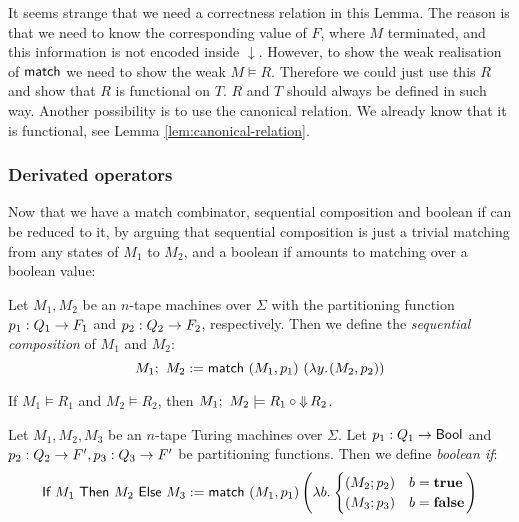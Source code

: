 \documentclass{psartcl}
\begin{document}
It seems strange that we need a correctness relation in this Lemma.  The reason is that we need to know the corresponding value of $F$, where $M$
terminated, and this information is not encoded inside $\downarrow$.  However, to show the weak realisation of $\textsf{match}$ we need to show the weak
$M \vDash R$.  Therefore we could just use this $R$ and show that $R$ is functional on $T$.  $R$ and $T$ should always be defined in such way.
Another possibility is to use the canonical relation.  We already know that it is functional, see Lemma \ref{lem:canonical-relation}.

\subsubsection{Derivated operators}

Now that we have a match combinator, sequential composition and boolean if can be reduced to it, by arguing that sequential composition is just a
trivial matching from any states of $M_1$ to $M_2$, and a boolean if amounts to matching over a boolean value:


\begin{definition}
  \label{def:seq}
  Let $M_1, M_2$ be an $n$-tape machines over $\Sigma$ with the partitioning function $p_1 : Q_1 \rightarrow F_1$ and $p_2 : Q_2 \rightarrow F_2$,
  respectively.  Then we define the \emph{sequential composition} of $M_1$ and $M_2$:
  $$M_1 ;~ M_2 := \textsf{match}~(M_1, p_1)~(\lambda y{.}\hskip.7pt(M_2, p_2))$$
\end{definition}

\begin{corollary}
  \label{lem:seq}
  If $M_1 \vDash R_1$ and $M_2 \vDash R_2$, then $M_1 ;~ M_2 \models R_1 \circ \operatorname{\Downarrow} R_2$.
\end{corollary}

\begin{definition}[Boolean if]
  \label{def:if}
  Let $M_1, M_2, M_3$ be an $n$-tape Turing machines over $\Sigma$.
  Let $p_1 : Q_1 \rightarrow \textsf{Bool}$ and $p_2 : Q_2 \rightarrow F', p_3 : Q_3 \rightarrow F'$ be partitioning functions.
  Then we define \emph{boolean if}:
  $$\textsf{If}~M_1~\textsf{Then}~M_2~\textsf{Else}~M_3 := \textsf{match}~(M_1, p_1) \left(\lambda b{.}\hskip.7pt\begin{cases} (M_2; p_2) & b = \mathbf{true} \\ (M_3; p_3) & b = \mathbf{false} \end{cases} \right)$$
\end{definition}
\end{document}
